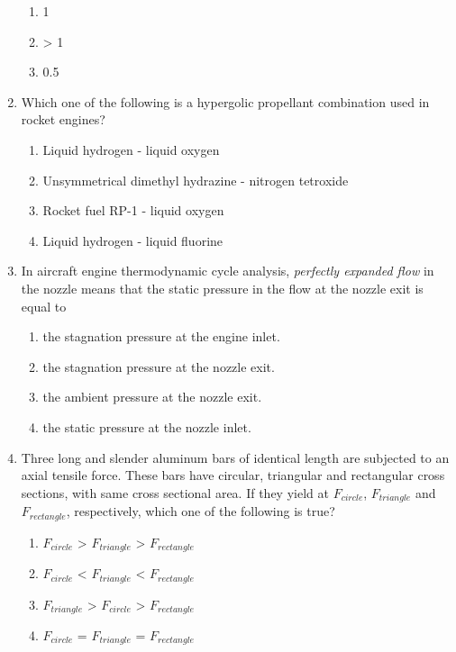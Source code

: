 \documentclass[journal]{IEEEtran}
\begin{document}
\begin{enumerate}
\begin{enumerate}
			\item 1
			\item > 1
			\item 0.5
		\end{enumerate}
	\item
	Which one of the following is a hypergolic propellant combination used in rocket engines?
		\begin{enumerate}
			\item Liquid hydrogen - liquid oxygen
			\item Unsymmetrical dimethyl hydrazine - nitrogen tetroxide
			\item Rocket fuel RP-1 - liquid oxygen
			\item Liquid hydrogen - liquid fluorine
		\end{enumerate}
	\item
	In aircraft engine thermodynamic cycle analysis, \textit{perfectly expanded flow} in the nozzle means that the static pressure in the flow at the nozzle exit is equal to
		\begin{enumerate}
			\item the stagnation pressure at the engine inlet.
			\item the stagnation pressure at the nozzle exit.
			\item the ambient pressure at the nozzle exit.
			\item the static pressure at the nozzle inlet.
		\end{enumerate}
	\item
	Three long and slender aluminum bars of identical length are subjected to an axial tensile force. These bars have circular, triangular and rectangular cross sections, with same cross sectional area. If they yield at $F_{circle}$, $F_{triangle}$ and $F_{rectangle}$, respectively, which one of the following is true?
		\begin{enumerate}
			\item $F_{circle}$ > $F_{triangle}$ > $F_{rectangle}$
			\item $F_{circle}$ < $F_{triangle}$ < $F_{rectangle}$
			\item $F_{triangle}$ > $F_{circle}$ > $F_{rectangle}$
			\item $F_{circle}$ = $F_{triangle}$ = $F_{rectangle}$
		\end{enumerate}
\end{enumerate}
\end{document}
